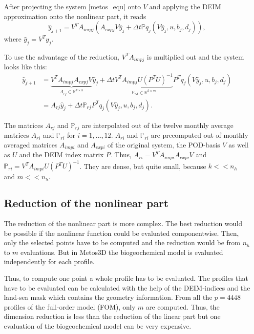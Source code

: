 After projecting the system \eqref{metos_equ} onto $V$ and applying the DEIM approximation onto the nonlinear part, it
reads
\begin{equation}\label{metos_equ_projected}
 \hat{y}_{j+1} = V^TA_{impj} (A_{expj}V \hat{y}_j + \Delta t    \mathbb{P} q_j(V \hat{y}_j,u,b_j,d_j)),
\end{equation}
where $\hat{y}_j = V^T y_j$.

To use the advantage of the reduction, $V^TA_{impj}$ is multiplied out and the system looks like this:
\begin{equation}\label{metos_red}
\begin{aligned}
 \hat{y}_{j+1} &= \underbrace{V^TA_{impj} A_{expj}V}_{A_{rj} \in \mathbb{R}^{k \times k}} 
 \hat{y}_j + \Delta t  \underbrace{V^TA_{impj} U(P^TU)^{-1}}_{\mathbb{P}_rj \in \mathbb{R}^{k \times m}} P^T q_j(V \hat{y}_j,u,b_j,d_j)
  \\ &= A_{rj} \hat{y}_j + \Delta t    \mathbb{P}_{rj} P^T q_j(V \hat{y}_j,u,b_j,d_j).
 \end{aligned}
\end{equation}
 
The matrices $A_{rj}$ and $\mathbb{P}_{rj}$ are interpolated out of the twelve monthly average matrices $A_{ri}$ and $\mathbb{P}_{ri}$ for $i = 1,...,12$.
$A_{ri}$ and $\mathbb{P}_{ri}$ are precomputed out of monthly averaged matrices $A_{impi}$ and $A_{expi}$ of the original system,
the POD-basis $V$ as well as $U$ and the DEIM index matrix $P$. Thus, $A_{ri} = V^T A_{impi} A_{expi} V$ and
$\mathbb{P}_{ri} = V^T A_{impi} U(P^TU)^{-1}$. They are dense, but quite small, because $k<<n_h$ and $m<<n_h$.

\subsection{Reduction of the nonlinear part}
The reduction of the nonlinear part is more complex. The best reduction would be possible if the nonlinear function could be evaluated componentwise. Then, only 
the selected points have to be computed and the reduction would be from $n_h$ to $m$ evaluations.
But in Metos3D the biogeochemical model is evaluated independently for each profile.


Thus, to compute one point a whole profile has to be evaluated. The profiles that have to be evaluated can be calculated with 
the help of the DEIM-indices and the land-sea mask which contains the geometry information.
From all the $p=4448$ profiles of the full-order model (FOM), only $m$ are computed. Thus, the dimension reduction is less
than the reduction of the linear part but one evaluation of the biogeochemical model can be very expensive.  
 

